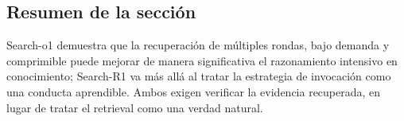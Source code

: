 \subsection{Resumen de la sección}

Search-o1 demuestra que la recuperación de múltiples rondas, bajo demanda y comprimible puede mejorar de manera significativa el razonamiento intensivo en conocimiento; Search-R1 va más allá al tratar la estrategia de invocación como una conducta aprendible. Ambos exigen verificar la evidencia recuperada, en lugar de tratar el retrieval como una verdad natural.

